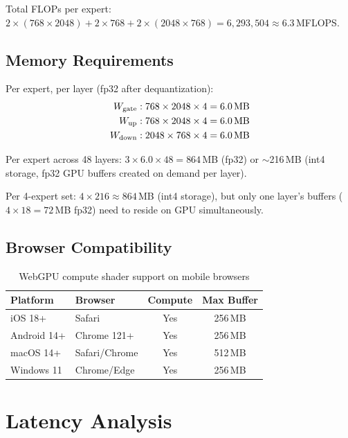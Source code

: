 \documentclass[11pt,a4paper]{article}
\begin{document}
Total FLOPs per expert: $2 \times (768 \times 2048) + 2 \times 768 +
2 \times (2048 \times 768) = 6,293,504 \approx 6.3$\,MFLOPS.

\subsection{Memory Requirements}

Per expert, per layer (fp32 after dequantization):
\begin{align*}
  W_{\text{gate}} &: 768 \times 2048 \times 4 = 6.0\text{\,MB} \\
  W_{\text{up}} &: 768 \times 2048 \times 4 = 6.0\text{\,MB} \\
  W_{\text{down}} &: 2048 \times 768 \times 4 = 6.0\text{\,MB}
\end{align*}

Per expert across 48 layers: $3 \times 6.0 \times 48 = 864$\,MB (fp32)
or $\sim$216\,MB (int4 storage, fp32 GPU buffers created on demand per
layer).

Per 4-expert set: $4 \times 216 \approx 864$\,MB (int4 storage), but
only one layer's buffers ($4 \times 18 = 72$\,MB fp32) need to reside
on GPU simultaneously.

\subsection{Browser Compatibility}

\begin{table}[h]
\centering
\caption{WebGPU compute shader support on mobile browsers}
\label{tab:compat}
\begin{tabular}{@{}llcc@{}}
\toprule
Platform & Browser & Compute & Max Buffer \\
\midrule
iOS 18+ & Safari & Yes & 256\,MB \\
Android 14+ & Chrome 121+ & Yes & 256\,MB \\
macOS 14+ & Safari/Chrome & Yes & 512\,MB \\
Windows 11 & Chrome/Edge & Yes & 256\,MB \\
\bottomrule
\end{tabular}
\end{table}

\section{Latency Analysis}
\label{sec:latency}
\end{document}
